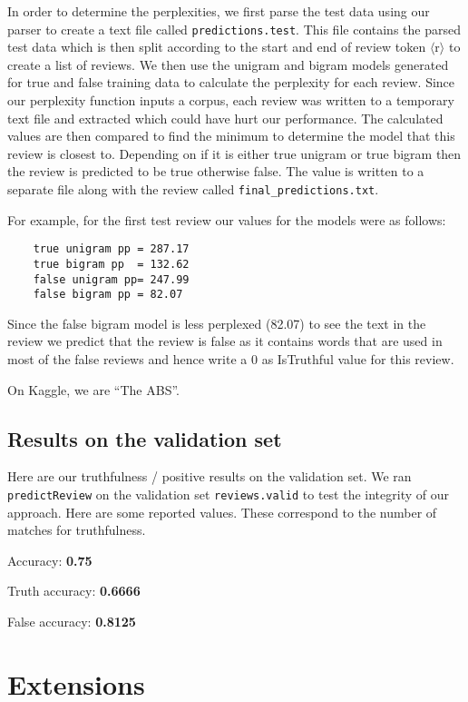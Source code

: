 \documentclass{article}
\begin{document}
In order to determine the perplexities, we first parse the test data using our parser to create a text file called \texttt{predictions.test}. This file contains the parsed test data which is then split according to the start and end of review token $\langle$r$\rangle$ to create a list of reviews. We then use the unigram and bigram models generated for true and false training data to calculate the perplexity for each review. Since our perplexity function inputs a corpus, each review was written to a temporary text file and extracted which could have hurt our performance. The calculated values are then compared to find the minimum to determine the model that this review is closest to. Depending on if it is either true unigram or true bigram then the review is predicted to be true otherwise false. The value is written to a separate file along with the review called \texttt{final\_predictions.txt}.\par

For example, for the first test review our values for the models were as follows:
{\small\begin{verbatim}
    true unigram pp = 287.17
    true bigram pp  = 132.62
    false unigram pp= 247.99
    false bigram pp = 82.07
\end{verbatim}}

Since the false bigram model is less perplexed (82.07) to see the text in the review we predict that the review is false as it contains words that are used in most of the false reviews and hence write a 0 as IsTruthful value for this review.

On Kaggle, we are ``The ABS''.

\subsection{Results on the validation set}
Here are our truthfulness / positive results on the validation set. We ran \texttt{predictReview} on the validation set \texttt{reviews.valid} to test the integrity of our approach. Here are some reported values. These correspond to the number of matches for truthfulness.

Accuracy: \textbf{0.75}\par
Truth accuracy: \textbf{0.6666}\par
False accuracy: \textbf{0.8125}

\section{Extensions}
\end{document}
